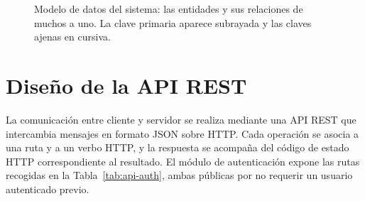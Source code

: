 \documentclass[12pt,a4paper,twoside,openright]{book}
\begin{document}
\begin{figure}[htbp]
        \caption{Modelo de datos del sistema: las entidades y sus relaciones de
        muchos a uno. La clave primaria aparece subrayada y las claves ajenas en
        cursiva.}
        \label{fig:modelo-datos}
    \end{figure}


    \section{Diseño de la API REST}
    La comunicación entre cliente y servidor se realiza mediante una API REST
    que intercambia mensajes en formato JSON sobre HTTP. Cada operación se asocia
    a una ruta y a un verbo HTTP, y la respuesta se acompaña del código de estado
    HTTP correspondiente al resultado. El módulo de autenticación expone las
    rutas recogidas en la Tabla~\ref{tab:api-auth}, ambas públicas por no
    requerir un usuario autenticado previo.
\end{document}
